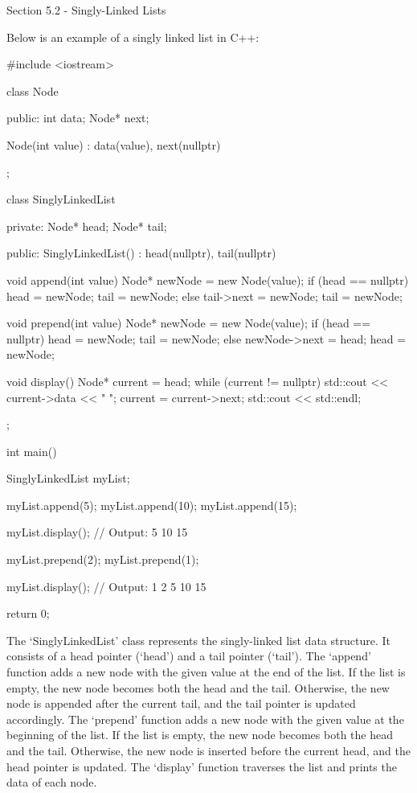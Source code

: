 \begin{notes}{Section 5.2 - Singly-Linked Lists}
    \begin{highlight}
        Below is an example of a singly linked list in C++:
    
    \begin{code}[C++]
    #include <iostream>

    class Node {
    public:
        int data;
        Node* next;
    
        Node(int value) : data(value), next(nullptr) {}
    };
    
    class SinglyLinkedList {
    private:
        Node* head;
        Node* tail;
    
    public:
        SinglyLinkedList() : head(nullptr), tail(nullptr) {}
    
        void append(int value) {
            Node* newNode = new Node(value);
            if (head == nullptr) {
                head = newNode;
                tail = newNode;
            } else {
                tail->next = newNode;
                tail = newNode;
            }
        }
    
        void prepend(int value) {
            Node* newNode = new Node(value);
            if (head == nullptr) {
                head = newNode;
                tail = newNode;
            } else {
                newNode->next = head;
                head = newNode;
            }
        }
    
        void display() {
            Node* current = head;
            while (current != nullptr) {
                std::cout << current->data << " ";
                current = current->next;
            }
            std::cout << std::endl;
        }
    };
    
    int main() {
        SinglyLinkedList myList;
    
        myList.append(5);
        myList.append(10);
        myList.append(15);
    
        myList.display();  // Output: 5 10 15
    
        myList.prepend(2);
        myList.prepend(1);
    
        myList.display();  // Output: 1 2 5 10 15
    
        return 0;
    }
    \end{code}
        The `SinglyLinkedList' class represents the singly-linked list data structure. It consists of a head pointer (`head') and a tail pointer (`tail'). The `append' function adds a new node with the given value at the end of the list. 
        If the list is empty, the new node becomes both the head and the tail. Otherwise, the new node is appended after the current tail, and the tail pointer is updated accordingly. The `prepend' function adds a new node with the given 
        value at the beginning of the list. If the list is empty, the new node becomes both the head and the tail. Otherwise, the new node is inserted before the current head, and the head pointer is updated. The `display' function traverses 
        the list and prints the data of each node.
    

\end{highlight}
\end{notes}
